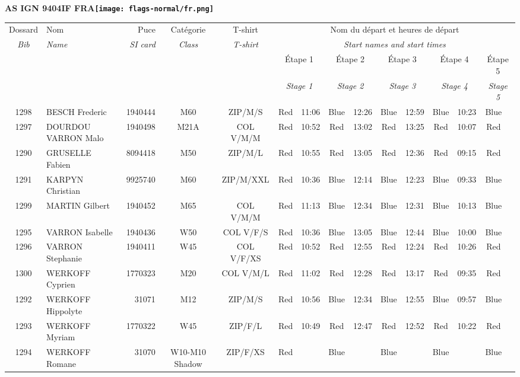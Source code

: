 \documentclass{report}
\begin{document}
\newpage
  \Huge \centering \bfseries AS IGN 9404IF FRA\normalfont \footnotesize \sffamily \hfill \texttt{[image: flags-normal/fr.png]} \newline 
  \begin{longtable}{|c|l|r|c|c|*{5}{cc|}}
    Dossard & Nom  & Puce    & Catégorie & T-shirt & \multicolumn{10}{c|}{Nom du départ et heures de départ} \\
    \itshape Bib     & \itshape Name & \itshape SI card & \itshape Class  & \itshape  T-shirt  & \multicolumn{10}{c|}{\itshape Start names and start times} \\
    \hline
    & & & & & \multicolumn{2}{c|}{Étape 1} & \multicolumn{2}{c|}{Étape 2} & \multicolumn{2}{c|}{Étape 3} & \multicolumn{2}{c|}{Étape 4} & \multicolumn{2}{c|}{Étape 5} \\
    & & & & & \multicolumn{2}{c|}{\itshape Stage 1} & \multicolumn{2}{c|}{\itshape Stage 2} & \multicolumn{2}{c|}{\itshape Stage 3} & \multicolumn{2}{c|}{\itshape Stage 4} & \multicolumn{2}{c|}{\itshape Stage 5} \\
    \hline
    1298 & BESCH Frederic & 1940444 & M60 & ZIP/M/S & Red & 11:06 & Blue & 12:26 & Blue & 12:59 & Blue & 10:23 & Blue &  \\
    1297 & DOURDOU VARRON Malo & 1940498 & M21A & COL V/M/M & Red & 10:52 & Red & 13:02 & Red & 13:25 & Red & 10:07 & Red &  \\
    1290 & GRUSELLE Fabien & 8094418 & M50 & ZIP/M/L & Red & 10:55 & Red & 13:05 & Red & 12:36 & Red & 09:15 & Red &  \\
    1291 & KARPYN Christian & 9925740 & M60 & ZIP/M/XXL & Red & 10:36 & Blue & 12:14 & Blue & 12:23 & Blue & 09:33 & Blue &  \\
    1299 & MARTIN Gilbert & 1940452 & M65 & COL V/M/M & Red & 11:13 & Blue & 12:34 & Blue & 12:31 & Blue & 10:13 & Blue &  \\
    1295 & VARRON Isabelle & 1940436 & W50 & COL V/F/S & Red & 10:36 & Blue & 13:05 & Blue & 12:44 & Blue & 10:00 & Blue &  \\
    1296 & VARRON Stephanie & 1940411 & W45 & COL V/F/XS & Red & 10:52 & Red & 12:55 & Red & 12:24 & Red & 10:26 & Red &  \\
    1300 & WERKOFF Cyprien & 1770323 & M20 & COL V/M/L & Red & 11:02 & Red & 12:28 & Red & 13:17 & Red & 09:35 & Red &  \\
    1292 & WERKOFF Hippolyte & 31071 & M12 & ZIP/M/S & Red & 10:56 & Blue & 12:34 & Blue & 12:55 & Blue & 09:57 & Blue &  \\
    1293 & WERKOFF Myriam & 1770322 & W45 & ZIP/F/L & Red & 10:49 & Red & 12:47 & Red & 12:52 & Red & 10:22 & Red &  \\
    1294 & WERKOFF Romane & 31070 & W10-M10 Shadow & ZIP/F/XS & Red &   & Blue &   & Blue &   & Blue &   & Blue &  \\
  \end{longtable}
\end{document}
